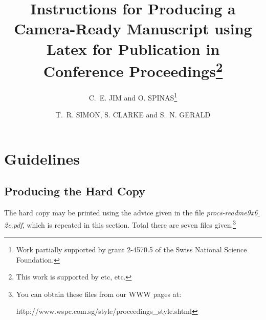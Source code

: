\documentclass{ws-procs9x6}
\begin{document}
\title{Instructions for Producing a Camera-Ready Manuscript 
using Latex for Publication in Conference 
Proceedings\footnote{\uppercase{T}his work is supported by etc, etc.}}

\author{C.~E. JIM and O. SPINAS\footnote{\uppercase{W}ork partially
supported by grant 2-4570.5 of the \uppercase{S}wiss 
\uppercase{N}ational \uppercase{S}cience \uppercase{F}oundation.}}

\address{World Scientific Publishing Co., Inc, \\
1060 Main Street, \\ 
River Edge, NJ 07661, USA\\ 
E-mail: wspc@wspc.com}

\author{T.~R. SIMON, S. CLARKE and S.~N. GERALD}

\address{World Scientific Publishing Co Ltd, \\ 
57 Shelton Street, \\
London WC2H 9HE, England\\
E-mail: wspc@wspc.ox.uk}  

\maketitle


\section{Guidelines}
\subsection{Producing the Hard Copy}\label{subsec:prod}
The hard copy may be printed using the advice given in the file
{\em procs-readme9x6$\_$2e.pdf}, which is repeated in this section. 
Total there are seven files given.\footnote{You can obtain these files 
from our WWW pages at:

{\sf http://www.wspc.com.sg/style/proceedings\_style.shtml}}
\end{document}
